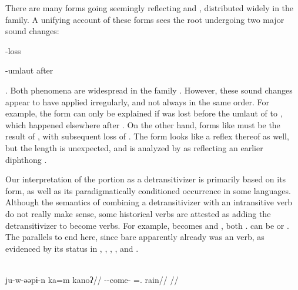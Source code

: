There are many forms going seemingly reflecting  and , distributed widely in the family.
A unifying account of these forms sees the root  undergoing two major sound changes: \begin{inlinelist}
 \item {}-loss
 \item {}-umlaut after 
 \end{inlinelist}.
Both phenomena are widespread in the family \parencite{meira2010origin}.
However, these sound changes appear to have applied irregularly, and not always in the same order.
For example, the \kalina form  can only be explained if  was lost before the umlaut of  to , which happened elsewhere after .
On the other hand, forms like \maqui {} must be the result of , with subsequent loss of .
The \akuriyo form  looks like a reflex thereof as well, but the length is unexpected, and is analyzed by \textcite[]{meira1998proto} as reflecting an earlier diphthong .


Our interpretation of the  portion as a detransitivizer is primarily based on its form, as well as its paradigmatically conditioned occurrence in some languages.
Although the semantics of combining a detransitivizer with an intransitive verb do not really make sense, some historical  verbs are attested as adding the detransitivizer to become  verbs.
For example,    becomes \trio {} \parencite[252]{triomeira1999} and \kalina {} \parencite[429]{courtz2008carib}, both .
\waiwai {} can be  \parencite[30]{waiwaihawkins1998} or  \parencite[204]{hawkins1953waiwai}.
The parallels to  end here, since bare   apparently already was an  verb, as evidenced by its status in \kaxui, \kalina, \panare {}, \arara, and \trio.

\panare \parencite[][65]{panarepayne2013}\\
\begingl
\gla ju-w-əəpɨ-n ka=m kanoʔ//
\glb {}--come- =. rain//
\glft {}//
\endgl
\xe

